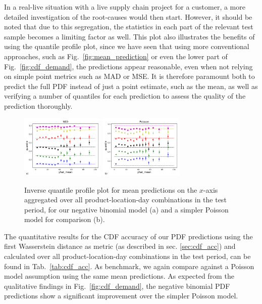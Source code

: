 \documentclass[BCOR=1mm, DIV=calc,10pt,
twoside=true,
twocolumn,
headings=normal]{scrartcl}
\newcommand{\fig}{Fig.~}
\newcommand{\tab}{Tab.~}
\begin{document}
\noindent
In a real-live situation with a live supply chain project for a customer, a more detailed investigation of the root-causes would then start. However, it should be noted that due to this segregation, the statistics in each part of the relevant test sample becomes a limiting factor as well. This plot also illustrates the benefits of using the quantile profile plot, since we have seen that using more conventional approaches, such as \fig \ref{fig:mean_prediction} or even the lower part of \fig \ref{fig:cdf_demand}, the predictions appear reasonable, even when not relying on simple point metrics such as MAD or MSE. It is therefore paramount both to predict the full PDF instead of just a point estimate, such as the mean, as well as verifying a number of quantiles for each prediction to assess the quality of the prediction thoroughly.

\begin{figure}
\begin{center}
\includegraphics[width=4cm]{figs/invquant_yhat_mean_nbinom}
\includegraphics[width=4cm]{figs/invquant_yhat_mean_poisson}
\caption{\label{fig:invquant_mean} Inverse quantile profile plot for mean predictions on the $x$-axis aggregated over all product-location-day combinations in the test period, for our negative binomial model (a) and a simpler Poisson model for comparison (b).}
\end{center}
\end{figure}

The quantitative results for the CDF accuracy of our PDF predictions using the first Wasserstein distance as metric (as described in sec. \ref{sec:cdf_acc}) and calculated over all product-location-day combinations in the test period, can be found in \tab \ref{tab:cdf_acc}. As benchmark, we again compare against a Poisson model assumption using the same mean predictions. As expected from the qualitative findings in \fig \ref{fig:cdf_demand}, the negative binomial PDF predictions show a significant improvement over the simpler Poisson model.
\end{document}
